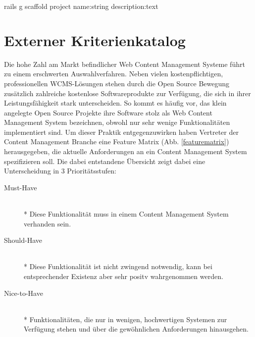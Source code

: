 \begin{lstinputlisting}
rails g scaffold project name:string description:text
\end{lstinputlisting}




\newpage

\section{Externer Kriterienkatalog}
Die hohe Zahl am Markt befindlicher Web Content Management Systeme führt zu einem erschwerten Auswahlverfahren. Neben vielen kostenpflichtigen, professionellen WCMS-Lösungen stehen durch die Open Source Bewegung zusätzlich zahlreiche kostenlose Softwareprodukte zur Verfügung, die sich in ihrer Leistungsfähigkeit stark unterscheiden.
So kommt es häufig vor, das klein angelegte Open Source Projekte ihre Software stolz als Web Content Management System bezeichnen, obwohl nur sehr wenige Funktionalitäten implementiert sind.
Um dieser Praktik entgegenzuwirken haben Vertreter der Content Management Branche eine Feature Matrix (Abb. \ref{featurematrix}) herausgegeben, die aktuelle Anforderungen an ein Content Management System spezifizieren soll. Die dabei entstandene Übersicht zeigt dabei eine Unterscheidung in 3 Prioritätsstufen:
\begin{description}
\item[Must-Have]\mbox{~}\\*
Diese Funktionalität muss in einem Content Management System verhanden sein.
\item[Should-Have]\mbox{~}\\*
Diese Funktionalität ist nicht zwingend notwendig, kann bei entsprechender Existenz aber sehr positv wahrgenommen werden.
\item[Nice-to-Have]\mbox{~}\\*
Funktionalitäten, die nur in wenigen, hochwertigen Systemen zur Verfügung stehen und über die gewöhnlichen Anforderungen hinausgehen.
\end{description}


